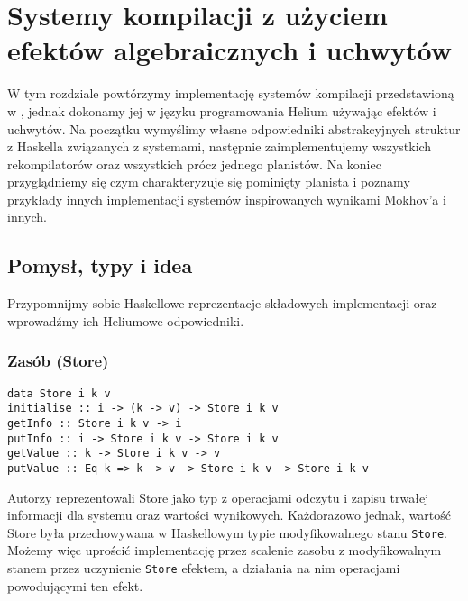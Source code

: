 
\newcommand{\haskinl}[1]{\lstinline[style=haskell-inl]{#1}}
\newcommand{\helinl}[1]{\lstinline[style=Haleff-inl]{#1}}

\chapter{Systemy kompilacji z użyciem efektów algebraicznych i uchwytów}
\label{chapter-bsue}

W tym rozdziale powtórzymy implementację systemów kompilacji przedstawioną w \BSaLC\cite{mokhov2018build}, jednak dokonamy jej w języku programowania Helium używając efektów i uchwytów. Na początku wymyślimy własne odpowiedniki abstrakcyjnych struktur z Haskella związanych z systemami, następnie zaimplementujemy wszystkich rekompilatorów oraz wszystkich prócz jednego planistów. Na koniec przyglądniemy się czym charakteryzuje się pominięty planista i poznamy przykłady innych implementacji systemów inspirowanych wynikami Mokhov'a i innych.

\section{Pomysł, typy i idea}

Przypomnijmy sobie Haskellowe reprezentacje składowych implementacji oraz wprowadźmy ich Heliumowe odpowiedniki.

\subsection{Zasób (Store)}

\begin{lstlisting}[style=haskell-style]
data Store i k v
initialise :: i -> (k -> v) -> Store i k v
getInfo :: Store i k v -> i
putInfo :: i -> Store i k v -> Store i k v
getValue :: k -> Store i k v -> v
putValue :: Eq k => k -> v -> Store i k v -> Store i k v
\end{lstlisting}

Autorzy \BSaLC\cite{mokhov2018build} reprezentowali Store jako typ z operacjami odczytu i zapisu trwałej informacji dla systemu oraz wartości wynikowych. Każdorazowo jednak, wartość Store była przechowywana w Haskellowym typie modyfikowalnego stanu \haskinl{Store}. Możemy więc uprościć implementację przez scalenie zasobu z modyfikowalnym stanem przez uczynienie \haskinl{Store} efektem, a działania na nim operacjami powodującymi ten efekt.



